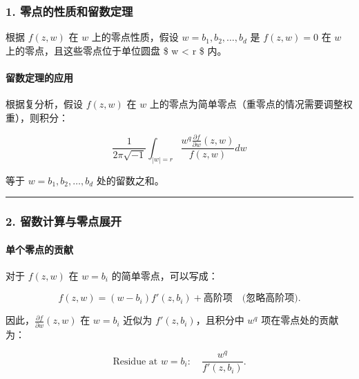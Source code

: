 \documentclass[lang=cn,zihao=-4,fontset=none,twoside]{fancybook}
\begin{document}
\hypertarget{ux96f6ux70b9ux7684ux6027ux8d28ux548cux7559ux6570ux5b9aux7406}{%
\subsubsection{1.
零点的性质和留数定理}\label{ux96f6ux70b9ux7684ux6027ux8d28ux548cux7559ux6570ux5b9aux7406}}

根据 \(f(z, w)\) 在 \(w\) 上的零点性质，假设
\(w = b_1, b_2, \dots, b_d\) 是 \(f(z, w) = 0\) 在 \(w\)
上的零点，且这些零点位于单位圆盘 \$ \textbar{}w\textbar{} \textless{} r
\$ 内。

\hypertarget{ux7559ux6570ux5b9aux7406ux7684ux5e94ux7528}{%
\paragraph{留数定理的应用}\label{ux7559ux6570ux5b9aux7406ux7684ux5e94ux7528}}

根据复分析，假设 \(f(z, w)\) 在 \(w\)
上的零点为简单零点（重零点的情况需要调整权重），则积分：

\[
\frac{1}{2\pi \sqrt{-1}} \int_{|w|=r} \frac{w^q \frac{\partial f}{\partial w}(z, w)}{f(z, w)} dw
\]

等于 \(w = b_1, b_2, \dots, b_d\) 处的留数之和。

\begin{center}\rule{0.5\linewidth}{0.5pt}\end{center}

\hypertarget{ux7559ux6570ux8ba1ux7b97ux4e0eux96f6ux70b9ux5c55ux5f00}{%
\subsubsection{2.
留数计算与零点展开}\label{ux7559ux6570ux8ba1ux7b97ux4e0eux96f6ux70b9ux5c55ux5f00}}

\hypertarget{ux5355ux4e2aux96f6ux70b9ux7684ux8d21ux732e}{%
\paragraph{单个零点的贡献}\label{ux5355ux4e2aux96f6ux70b9ux7684ux8d21ux732e}}

对于 \(f(z, w)\) 在 \(w = b_i\) 的简单零点，可以写成：

\[
f(z, w) = (w - b_i) f'(z, b_i) + \text{高阶项} \quad \text{(忽略高阶项)}.
\]

因此，\(\frac{\partial f}{\partial w}(z, w)\) 在 \(w = b_i\) 近似为
\(f'(z, b_i)\)，且积分中 \(w^q\) 项在零点处的贡献为：

\[
    \text{Residue at } w = b_i: \quad \frac{w^q}{f'(z, b_i)}.
\]
\end{document}
